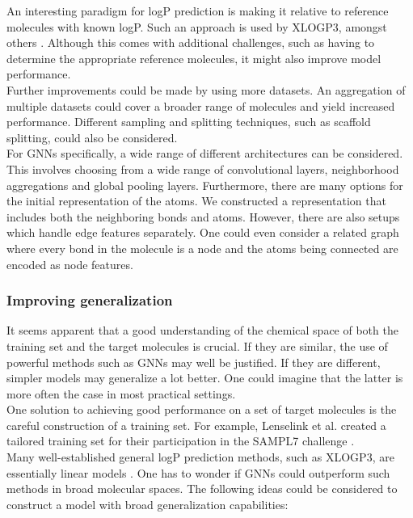 \documentclass{article}
\theoremstyle{definition}
\theoremstyle{remark}
\begin{document}
An interesting paradigm for logP prediction is making it relative to reference molecules with known logP. Such an approach is used by XLOGP3, amongst others \cite{cheng2007computation}. Although this comes with additional challenges, such as having to determine the appropriate reference molecules, it might also improve model performance. \\

Further improvements could be made by using more datasets. An aggregation of multiple datasets could cover a broader range of molecules and yield increased performance. Different sampling and splitting techniques, such as scaffold splitting, could also be considered. \\

For GNNs specifically, a wide range of different architectures can be considered. This involves choosing from a wide range of convolutional layers, neighborhood aggregations and global pooling layers. Furthermore, there are many options for the initial representation of the atoms. We constructed a representation that includes both the neighboring bonds and atoms. However, there are also setups which handle edge features separately. One could even consider a related graph where every bond in the molecule is a node and the atoms being connected are encoded as node features. \\

\subsubsection{Improving generalization}

It seems apparent that a good understanding of the chemical space of both the training set and the target molecules is crucial. If they are similar, the use of powerful methods such as GNNs may well be justified. If they are different, simpler models may generalize a lot better. One could imagine that the latter is more often the case in most practical settings. \\

One solution to achieving good performance on a set of target molecules is the careful construction of a training set. For example, Lenselink et al. created a tailored training set for their participation in the SAMPL7 challenge \cite{lenselink2021multitask}. \\

Many well-established general logP prediction methods, such as XLOGP3, are essentially linear models \cite{cheng2007computation}. One has to wonder if GNNs could outperform such methods in broad molecular spaces. The following ideas could be considered to construct a model with broad generalization capabilities:
\end{document}
